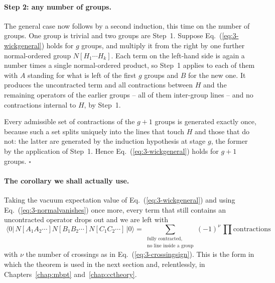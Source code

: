 \paragraph{Step 2: any number of groups.}
The general case now follows by a second induction, this time on the number of
groups.  One group is trivial and two groups are Step~1.  Suppose
Eq.~(\ref{eq:3-wickgeneral}) holds for $g$ groups, and multiply it from the
right by one further normal-ordered group $N[H_1\cdots H_k]$.  Each term on
the left-hand side is again a number times a single normal-ordered product, so
Step~1 applies to each of them with $A$ standing for what is left of the first
$g$ groups and $B$ for the new one.  It produces the uncontracted term and all
contractions between $H$ and the remaining operators of the earlier groups --
all of them inter-group lines -- and no contractions internal to $H$, by
Step~1.

Every admissible set of contractions of the $g+1$ groups is generated exactly
once, because such a set splits uniquely into the lines that touch $H$ and
those that do not: the latter are generated by the induction hypothesis at
stage $g$, the former by the application of Step~1.  Hence
Eq.~(\ref{eq:3-wickgeneral}) holds for $g+1$ groups. \hfill$\square$

\paragraph{The corollary we shall actually use.}
Taking the vacuum expectation value of Eq.~(\ref{eq:3-wickgeneral}) and using
Eq.~(\ref{eq:3-normalvanishes}) once more, every term that still contains an
uncontracted operator drops out and we are left with
\begin{equation}
  \boxed{\;
  \langle 0\vert\,N\left[A_1A_2\cdots\right]
   N\left[B_1B_2\cdots\right]N\left[C_1C_2\cdots\right]\,\vert 0\rangle
   = \sum_{\substack{\text{fully contracted,}\\ \text{no line inside a group}}}
     (-1)^{\nu}\,\prod \text{contractions} \;}
  \label{eq:3-wickgeneralvev}
\end{equation}
with $\nu$ the number of crossings as in Eq.~(\ref{eq:3-crossingsign}).  This
is the form in which the theorem is used in the next section and,
relentlessly, in Chapters~\ref{chap:mbpt} and~\ref{chap:cctheory}.

